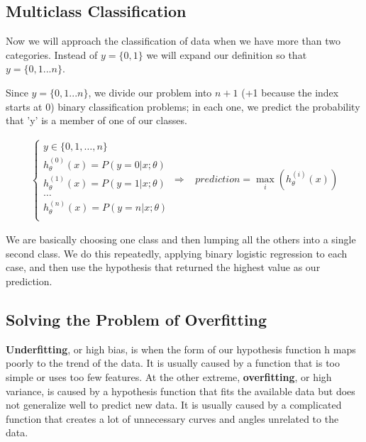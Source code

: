 \documentclass{article}
\begin{document}
        \subsection{Multiclass Classification}

            Now we will approach the classification of data when we have more than two categories. Instead of $y = \{0,1\}$ we will expand our definition so that $y = \{0,1...n\}$.

            Since $y = \{0,1...n\}$, we divide our problem into $n+1$ (+1 because the index starts at 0) binary classification problems; in each one, we predict 
            the probability that 'y' is a member of one of our classes.

            \begin{align*}
                \begin{cases}
                    y \in \{0,1,\ldots, n\} \\
                    h_{\theta}^{(0)}(x) = P(y=0|x;\theta) \\
                    h_{\theta}^{(1)}(x) = P(y=1|x;\theta) \\
                    \ldots \\
                    h_{\theta}^{(n)}(x) = P(y=n|x;\theta) \\
                \end{cases}
                \Longrightarrow \; \; \; prediction = \max_{i}(h_{\theta}^{(i)}(x))
            \end{align*}

            We are basically choosing one class and then lumping all the others into a single second class. We do this repeatedly, applying binary logistic 
            regression to each case, and then use the hypothesis that returned the highest value as our prediction.
        
        \subsection{Solving the Problem of Overfitting}

            \textbf{Underfitting}, or high bias, is when the form of our hypothesis function h maps poorly to the trend of the data. 
            It is usually caused by a function that is too simple or uses too few features. At the other extreme, \textbf{overfitting}, or high variance, 
            is caused by a hypothesis function that fits the available data but does not generalize well to predict new data. It is usually caused by 
            a complicated function that creates a lot of unnecessary curves and angles unrelated to the data.
\end{document}
